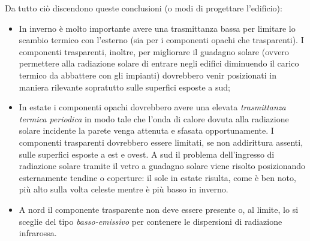 Da tutto ciò discendono queste conclusioni (o modi di progettare l'edificio):
\begin{itemize}
	\item In inverno è molto importante avere una trasmittanza bassa per limitare lo scambio termico con l'esterno (sia per i componenti opachi che trasparenti). I componenti trasparenti, inoltre, per migliorare il guadagno solare (ovvero permettere alla radiazione solare di entrare negli edifici diminuendo il carico termico da abbattere con gli impianti) dovrebbero venir posizionati in maniera rilevante sopratutto sulle superfici esposte a sud;
	\item In estate i componenti opachi dovrebbero avere una elevata \emph{trasmittanza termica periodica} in modo tale che l'onda di calore dovuta alla radiazione solare incidente la parete venga attenuta e sfasata opportunamente. I componenti trasparenti dovrebbero essere limitati, se non addirittura assenti, sulle superfici esposte a est e ovest. A sud il problema dell'ingresso di radiazione solare tramite il vetro a guadagno solare viene risolto posizionando esternamente tendine o coperture: il sole in estate risulta, come è ben noto, più alto sulla volta celeste mentre è più basso in inverno. 
	\item A nord il componente trasparente non deve essere presente o, al limite, lo si sceglie del tipo \emph{basso-emissivo} per contenere le dispersioni di radiazione infrarossa. 
\end{itemize}